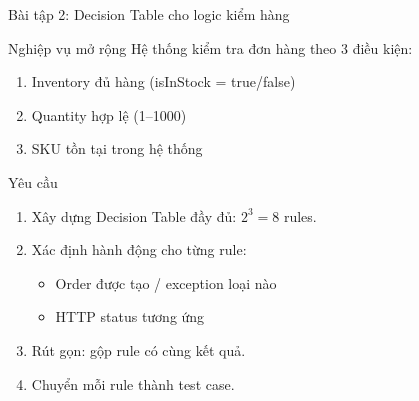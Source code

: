 \documentclass[aspectratio=169,12pt]{beamer}
\begin{document}
\begin{frame}[shrink=10]{Bài tập 2: Decision Table cho logic kiểm hàng}
  \begin{block}{Nghiệp vụ mở rộng}
    Hệ thống kiểm tra đơn hàng theo 3 điều kiện:
    \begin{enumerate}
      \item Inventory đủ hàng (isInStock = true/false)
      \item Quantity hợp lệ (1--1000)
      \item SKU tồn tại trong hệ thống
    \end{enumerate}
  \end{block}

  \vspace{0.1em}
  \begin{block}{Yêu cầu}
    \small
    \begin{enumerate}
      \item Xây dựng Decision Table đầy đủ: $2^3 = 8$ rules.
      \item Xác định hành động cho từng rule:
        \begin{itemize}
          \item Order được tạo / exception loại nào
          \item HTTP status tương ứng
        \end{itemize}
      \item Rút gọn: gộp rule có cùng kết quả.
      \item Chuyển mỗi rule thành test case.
    \end{enumerate}
  \end{block}
\end{frame}
\end{document}
